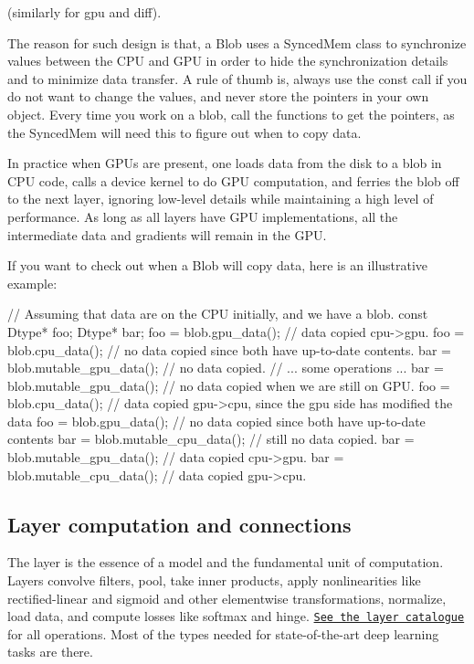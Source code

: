 (similarly for gpu and diff).

The reason for such design is that, a Blob uses a Synced\+Mem class to synchronize values between the C\+PU and G\+PU in order to hide the synchronization details and to minimize data transfer. A rule of thumb is, always use the const call if you do not want to change the values, and never store the pointers in your own object. Every time you work on a blob, call the functions to get the pointers, as the Synced\+Mem will need this to figure out when to copy data.

In practice when G\+P\+Us are present, one loads data from the disk to a blob in C\+PU code, calls a device kernel to do G\+PU computation, and ferries the blob off to the next layer, ignoring low-\/level details while maintaining a high level of performance. As long as all layers have G\+PU implementations, all the intermediate data and gradients will remain in the G\+PU.

If you want to check out when a Blob will copy data, here is an illustrative example\+: \begin{DoxyVerb}// Assuming that data are on the CPU initially, and we have a blob.
const Dtype* foo;
Dtype* bar;
foo = blob.gpu_data(); // data copied cpu->gpu.
foo = blob.cpu_data(); // no data copied since both have up-to-date contents.
bar = blob.mutable_gpu_data(); // no data copied.
// ... some operations ...
bar = blob.mutable_gpu_data(); // no data copied when we are still on GPU.
foo = blob.cpu_data(); // data copied gpu->cpu, since the gpu side has modified the data
foo = blob.gpu_data(); // no data copied since both have up-to-date contents
bar = blob.mutable_cpu_data(); // still no data copied.
bar = blob.mutable_gpu_data(); // data copied cpu->gpu.
bar = blob.mutable_cpu_data(); // data copied gpu->cpu.
\end{DoxyVerb}


\subsection*{Layer computation and connections}

The layer is the essence of a model and the fundamental unit of computation. Layers convolve filters, pool, take inner products, apply nonlinearities like rectified-\/linear and sigmoid and other elementwise transformations, normalize, load data, and compute losses like softmax and hinge. \href{layers.html}{\tt See the layer catalogue} for all operations. Most of the types needed for state-\/of-\/the-\/art deep learning tasks are there.



